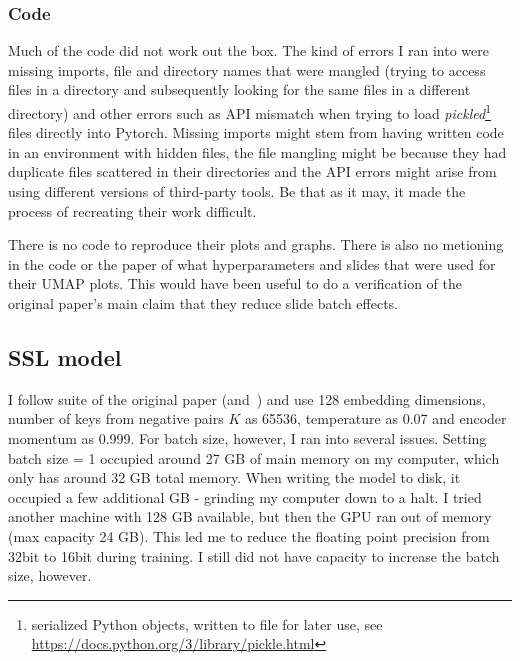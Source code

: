 \documentclass[10pt,twocolumn,letterpaper]{article}
\begin{document}
\subsubsection{Code}\label{subsubsec:code}
Much of the code did not work out the box. The kind of errors I ran into were missing imports, file and directory names that were mangled (trying to access files in a directory and subsequently looking for the same files in a different directory) and other errors such as API mismatch when trying to load \textit{pickled}\footnote{serialized Python objects, written to file for later use, see \href{https://docs.python.org/3/library/pickle.html}{https://docs.python.org/3/library/pickle.html}} files directly into Pytorch. Missing imports might stem from having written code in an environment with hidden files, the file mangling might be because they had duplicate files scattered in their directories and the API errors might arise from using different versions of third-party tools. Be that as it may, it made the process of recreating their work difficult.

There is no code to reproduce their plots and graphs. There is also no metioning in the code or the paper of what hyperparameters and slides that were used for their \gls{UMAP} plots. This would have been useful to do a verification of the original paper's main claim that they reduce slide batch effects.

\subsection{SSL model}\label{subsec:mymodel}
I follow suite of the original paper (and~\cite{moco}) and use 128 embedding dimensions, number of keys from negative pairs $K$ as 65536, temperature as 0.07 and encoder momentum as 0.999. For batch size, however, I ran into several issues. Setting batch size = 1 occupied around 27 GB of main memory on my computer, which only has around 32 GB total memory. When writing the model to disk, it occupied a few additional GB - grinding my computer down to a halt. I tried another machine with 128 GB available, but then the \gls{GPU} ran out of memory (max capacity 24 GB). This led me to reduce the floating point precision from 32bit to 16bit during training. I still did not have capacity to increase the batch size, however.
\end{document}
